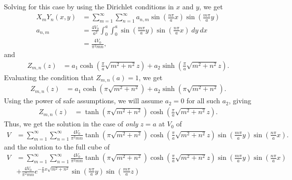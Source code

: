\documentclass[10pt]{mypackage}
\begin{document}
\begin{solution}[41.13]
\begin{enumerate}[(a)]
      Solving for this case by using the Dirichlet conditions in $x$ and $y$, we get
      \begin{align*}
        X_mY_n(x,y) &= \sum_{m=1}^{\infty}\sum_{n=1}^{\infty}a_{n,m}\sin\left( \frac{n\pi}{a}x \right)\sin\left( \frac{m\pi}{a}y \right)\\
        a_{n,m} &= \frac{4V_0}{a^2} \int_{0}^{a} \int_{0}^{a} \sin\left( \frac{m\pi}{a}y \right)\sin\left( \frac{n\pi}{a}x \right)\:dy\:dx\\
                &= \frac{4V_0}{\pi^2mn},
      \end{align*}
      and
      \begin{align*}
        Z_{m,n}(z) &= a_1\cosh\left( \frac{\pi}{a}\sqrt{m^2 + n^2} z \right) + a_2\sinh\left( \frac{\pi}{a}\sqrt{m^2 + n^2} z \right).
      \end{align*}
      Evaluating the condition that $Z_{m,n}(a) =1 $, we get
      \begin{align*}
        Z_{m,n}(z) &= a_1\cosh\left( \pi\sqrt{m^2 + n^2} \right) + a_2\sinh\left( \pi\sqrt{m^2 + n^2} \right).
      \end{align*}
      Using the power of safe assumptions, we will assume $a_2 = 0$ for all such $a_2$, giving
      \begin{align*}
        Z_{m,n}(z) &= \tanh\left( \pi\sqrt{m^2 + n^2} \right)\cosh\left( \frac{\pi}{a}\sqrt{m^2 + n^2} z \right).
      \end{align*}
      Thus, we get the solution in the case of \textit{only} $z=a$ at $V_0$ of
      \begin{align*}
        V &= \sum_{m=1}^{\infty}\sum_{n=1}^{\infty} \frac{4V_0}{\pi^2mn}\tanh\left( \pi\sqrt{m^2 + n^2} \right)\cosh\left( \frac{\pi}{a}\sqrt{m^2 + n^2} z \right)\sin\left( \frac{m\pi}{a}y \right)\sin\left( \frac{n\pi}{a}x \right).
      \end{align*}
      and the solution to the full cube of
      \begin{align*}
        V &= \sum_{m=1}^{\infty}\sum_{n=1}^{\infty} \frac{4V_0}{\pi^2mn}\tanh\left( \pi\sqrt{m^2 + n^2} \right)\cosh\left( \frac{\pi}{a}\sqrt{m^2 + n^2} z \right)\sin\left( \frac{m\pi}{a}y \right)\sin\left( \frac{n\pi}{a}x \right)\\
          &+ \frac{4V_0}{\pi^2 mn}e^{-\frac{\pi}{a}x\sqrt{m^2 + n^2}}\sin\left( \frac{n\pi}{a}y \right)\sin\left( \frac{m\pi}{a}z \right)
      \end{align*}
  \end{enumerate}
\end{solution}
\end{document}
